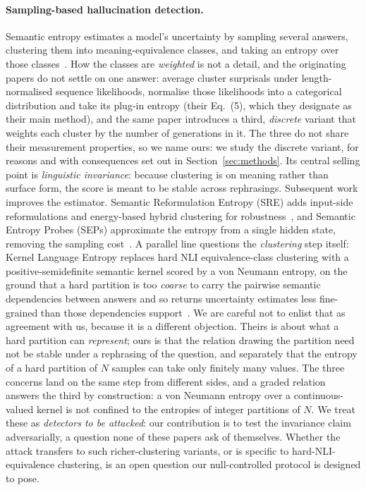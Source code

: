 \paragraph{Sampling-based hallucination detection.}
Semantic entropy estimates a model's uncertainty by sampling several answers,
clustering them into meaning-equivalence classes, and taking an entropy over those
classes~\citep{kuhn2023semantic,farquhar2024detecting}. How the classes are \emph{weighted}
is not a detail, and the originating papers do not settle on one answer:
\citet{kuhn2023semantic} average cluster surprisals under length-normalised sequence
likelihoods, \citet{farquhar2024detecting} normalise those likelihoods into a categorical
distribution and take its plug-in entropy (their Eq.~(5), which they designate as their main
method), and the same paper introduces a third, \emph{discrete} variant that weights each
cluster by the number of generations in it. The three do not share their measurement
properties, so we name ours: we study the discrete variant, for reasons and with consequences
set out in Section~\ref{sec:methods}. Its central
selling point is \emph{linguistic invariance}: because clustering is on meaning
rather than surface form, the score is meant to be stable across rephrasings.
Subsequent work improves the estimator. Semantic Reformulation Entropy (SRE)
adds input-side reformulations and energy-based hybrid clustering for
robustness~\citep{tong2025sre}, and Semantic Entropy Probes (SEPs) approximate
the entropy from a single hidden state, removing the sampling
cost~\citep{kossen2024seps}. A parallel line questions the \emph{clustering} step
itself: Kernel Language Entropy replaces hard NLI equivalence-class clustering with a
positive-semidefinite semantic kernel scored by a von Neumann entropy, on the ground that a
hard partition is too \emph{coarse} to carry the pairwise semantic dependencies between
answers and so returns uncertainty estimates less fine-grained than those dependencies
support~\citep{nikitin2024kle}. We are careful not to enlist that as agreement with us,
because it is a different objection. Theirs is about what a hard partition can
\emph{represent}; ours is that the relation drawing the partition need not be stable under a
rephrasing of the question, and separately that the entropy of a hard partition of $N$ samples
can take only finitely many values. The three concerns land on the same step from different
sides, and a graded relation answers the third by construction: a von Neumann entropy over a
continuous-valued kernel is not confined to the entropies of integer partitions of $N$.
We treat these as \emph{detectors to be attacked}: our contribution is to test the invariance
claim adversarially, a question none of these papers ask of themselves. Whether the attack
transfers to such richer-clustering variants, or is specific to hard-NLI-equivalence
clustering, is an open question our null-controlled protocol is designed to pose.

